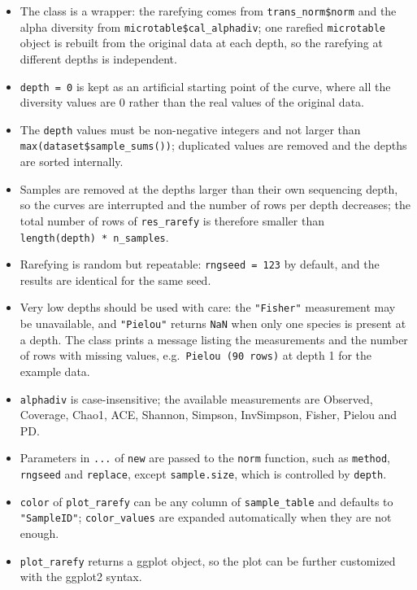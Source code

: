 \documentclass[
]{book}
\providecommand{\tightlist}{%
  \setlength{\itemsep}{0pt}\setlength{\parskip}{0pt}}
\begin{document}
\begin{itemize}
\tightlist
\item
  The class is a wrapper: the rarefying comes from \texttt{trans\_norm\$norm} and the alpha diversity from
  \texttt{microtable\$cal\_alphadiv}; one rarefied \texttt{microtable} object is rebuilt from the original data at each
  depth, so the rarefying at different depths is independent.
\item
  \texttt{depth\ =\ 0} is kept as an artificial starting point of the curve, where all the diversity values are 0
  rather than the real values of the original data.
\item
  The \texttt{depth} values must be non-negative integers and not larger than \texttt{max(dataset\$sample\_sums())};
  duplicated values are removed and the depths are sorted internally.
\item
  Samples are removed at the depths larger than their own sequencing depth, so the curves are interrupted
  and the number of rows per depth decreases; the total number of rows of \texttt{res\_rarefy} is therefore
  smaller than \texttt{length(depth)\ *\ n\_samples}.
\item
  Rarefying is random but repeatable: \texttt{rngseed\ =\ 123} by default, and the results are identical for the
  same seed.
\item
  Very low depths should be used with care: the \texttt{"Fisher"} measurement may be unavailable, and \texttt{"Pielou"}
  returns \texttt{NaN} when only one species is present at a depth. The class prints a message listing the
  measurements and the number of rows with missing values, e.g.~\texttt{Pielou\ (90\ rows)} at depth 1 for the
  example data.
\item
  \texttt{alphadiv} is case-insensitive; the available measurements are Observed, Coverage, Chao1, ACE, Shannon,
  Simpson, InvSimpson, Fisher, Pielou and PD.
\item
  Parameters in \texttt{...} of \texttt{new} are passed to the \texttt{norm} function, such as \texttt{method}, \texttt{rngseed} and
  \texttt{replace}, except \texttt{sample.size}, which is controlled by \texttt{depth}.
\item
  \texttt{color} of \texttt{plot\_rarefy} can be any column of \texttt{sample\_table} and defaults to \texttt{"SampleID"};
  \texttt{color\_values} are expanded automatically when they are not enough.
\item
  \texttt{plot\_rarefy} returns a ggplot object, so the plot can be further customized with the ggplot2 syntax.
\end{itemize}
\end{document}
